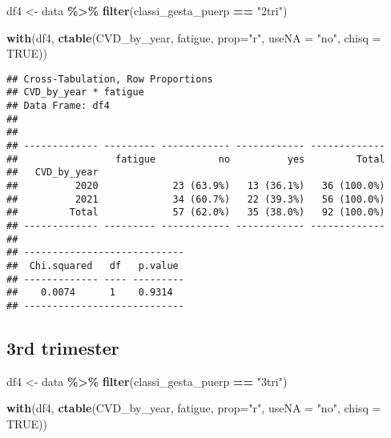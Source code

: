 \documentclass[
]{article}
\newenvironment{Shaded}{\begin{snugshade}}{\end{snugshade}}
\newcommand{\AttributeTok}[1]{\textcolor[rgb]{0.13,0.29,0.53}{#1}}
\newcommand{\ConstantTok}[1]{\textcolor[rgb]{0.56,0.35,0.01}{#1}}
\newcommand{\FunctionTok}[1]{\textcolor[rgb]{0.13,0.29,0.53}{\textbf{#1}}}
\newcommand{\NormalTok}[1]{#1}
\newcommand{\OtherTok}[1]{\textcolor[rgb]{0.56,0.35,0.01}{#1}}
\newcommand{\SpecialCharTok}[1]{\textcolor[rgb]{0.81,0.36,0.00}{\textbf{#1}}}
\newcommand{\StringTok}[1]{\textcolor[rgb]{0.31,0.60,0.02}{#1}}
\begin{document}
\begin{Shaded}
\begin{Highlighting}[]
\NormalTok{df4 }\OtherTok{\textless{}{-}}\NormalTok{ data }\SpecialCharTok{\%\textgreater{}\%} 
  \FunctionTok{filter}\NormalTok{(classi\_gesta\_puerp }\SpecialCharTok{==} \StringTok{"2tri"}\NormalTok{)}

\FunctionTok{with}\NormalTok{(df4, }\FunctionTok{ctable}\NormalTok{(CVD\_by\_year, fatigue, }\AttributeTok{prop=}\StringTok{"r"}\NormalTok{, }\AttributeTok{useNA =} \StringTok{"no"}\NormalTok{, }\AttributeTok{chisq =} \ConstantTok{TRUE}\NormalTok{))}
\end{Highlighting}
\end{Shaded}

\begin{verbatim}
## Cross-Tabulation, Row Proportions  
## CVD_by_year * fatigue  
## Data Frame: df4  
## 
## 
## ------------- --------- ------------ ------------ -------------
##                 fatigue           no          yes         Total
##   CVD_by_year                                                  
##          2020             23 (63.9%)   13 (36.1%)   36 (100.0%)
##          2021             34 (60.7%)   22 (39.3%)   56 (100.0%)
##         Total             57 (62.0%)   35 (38.0%)   92 (100.0%)
## ------------- --------- ------------ ------------ -------------
## 
## ----------------------------
##  Chi.squared   df   p.value 
## ------------- ---- ---------
##    0.0074      1    0.9314  
## ----------------------------
\end{verbatim}

\hypertarget{rd-trimester-3}{%
\subsection{3rd trimester}\label{rd-trimester-3}}

\begin{Shaded}
\begin{Highlighting}[]
\NormalTok{df4 }\OtherTok{\textless{}{-}}\NormalTok{ data }\SpecialCharTok{\%\textgreater{}\%} 
  \FunctionTok{filter}\NormalTok{(classi\_gesta\_puerp }\SpecialCharTok{==} \StringTok{"3tri"}\NormalTok{)}

\FunctionTok{with}\NormalTok{(df4, }\FunctionTok{ctable}\NormalTok{(CVD\_by\_year, fatigue, }\AttributeTok{prop=}\StringTok{"r"}\NormalTok{, }\AttributeTok{useNA =} \StringTok{"no"}\NormalTok{, }\AttributeTok{chisq =} \ConstantTok{TRUE}\NormalTok{))}
\end{Highlighting}
\end{Shaded}
\end{document}
